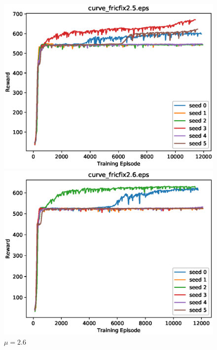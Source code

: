 \begin{figure}[p]
 \begin{minipage}{0.49\hsize}
  \begin{center}
 \includegraphics[width=.99\linewidth]{./fig/curve_fricfix2.5.eps}
  \caption{$\mu=2.5$
  }
  \end{center}
 \end{minipage}
 \begin{minipage}{0.49\hsize}
   \begin{center}
 \includegraphics[width=.99\linewidth]{./fig/curve_fricfix2.6.eps}
  \caption{$\mu=2.6$
     }
  \end{center}
 \end{minipage}
\end{figure}

